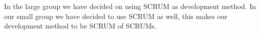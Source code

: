 In the large group we have decided on using SCRUM as development method. In our small group we have decided to use SCRUM as well, this makes our development method to be SCRUM of SCRUMs.